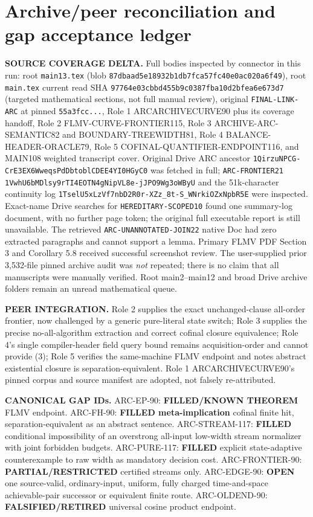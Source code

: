 \documentclass[11pt]{article}
\newcommand{\OPEN}{\textbf{OPEN}}
\newcommand{\PARTIAL}{\textbf{PARTIAL/RESTRICTED}}
\newcommand{\RET}{\textbf{FALSIFIED/RETIRED}}
\begin{document}
\section{Archive/peer reconciliation and gap acceptance ledger}
\noindent\textbf{SOURCE COVERAGE DELTA.} Full bodies inspected by connector in this run: root \texttt{main13.tex} (blob \texttt{87dbaad5e18932b1db7fca57fc40e0ac020a6f49}), root \texttt{main.tex} current read SHA \texttt{97764e03cbbd455b9c0387fba10d2bfea6e673d7} (targeted mathematical sections, not full manual review), original \texttt{FINAL-LINK-ARC} at pinned \texttt{55a3fcc...}, Role 1 ARCARCHIVECURVE90 plus its coverage handoff, Role 2 FLMV-CURVE-FRONTIER115, Role 3 ARCHIVE-ARC-SEMANTIC82 and BOUNDARY-TREEWIDTH81, Role 4 BALANCE-HEADER-ORACLE79, Role 5 COFINAL-QUANTIFIER-ENDPOINT116, and MAIN108 weighted transcript cover. Original Drive ARC ancestor \texttt{1QirzuNPCG-CrE3EX6WweqsPdDbtoblCDEE4YI0HGyC0} was fetched in full; \texttt{ARC-FRONTIER21} \texttt{1VwhU6bMDlsy9rTI4EOTN4gNipVL8e-jJPO9Wg3oWByU} and the 51k-character continuity log \texttt{1TselU5xLzVf7nbD2R0r-XZz_8t-S_WNrkiOZxNpbR5E} were inspected. Exact-name Drive searches for \texttt{HEREDITARY-SCOPED10} found one summary-log document, with no further page token; the original full executable report is still unavailable. The retrieved \texttt{ARC-UNANNOTATED-JOIN22} native Doc had zero extracted paragraphs and cannot support a lemma. Primary FLMV PDF Section 3 and Corollary 5.8 received successful screenshot review. The user-supplied prior 3,532-file pinned archive audit was \emph{not} repeated; there is no claim that all manuscripts were manually verified. Root main2--main12 and broad Drive archive folders remain an unread mathematical queue.

\par\noindent\textbf{PEER INTEGRATION.} Role 2 supplies the exact unchanged-clause all-order frontier, now challenged by a generic pure-literal state switch; Role 3 supplies the precise no-all-algorithm extraction and correct cofinal closure equivalence; Role 4's single compiler-header field query bound remains acquisition-order and cannot provide (3); Role 5 verifies the same-machine FLMV endpoint and notes abstract existential closure is separation-equivalent. Role 1 ARCARCHIVECURVE90's pinned corpus and source manifest are adopted, not falsely re-attributed.

\par\noindent\textbf{CANONICAL GAP IDs.} ARC-EP-90: \textbf{FILLED/KNOWN THEOREM} FLMV endpoint. ARC-FH-90: \textbf{FILLED meta-implication} cofinal finite hit, separation-equivalent as an abstract sentence. ARC-STREAM-117: \textbf{FILLED} conditional impossibility of an overstrong all-input low-width stream normalizer with joint forbidden budgets. ARC-PURE-117: \textbf{FILLED} explicit state-adaptive counterexample to raw width as mandatory decision cost. ARC-FRONTIER-90: \PARTIAL{} certified streams only. ARC-EDGE-90: \OPEN{} one source-valid, ordinary-input, uniform, fully charged time-and-space achievable-pair successor or equivalent finite route. ARC-OLDEND-90: \RET{} universal cosine product endpoint.
\end{document}
